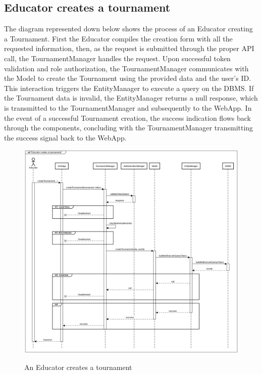 \documentclass{Configuration_Files/Template}
\begin{document}
\subsection{Educator creates a tournament }

The diagram represented down below shows the process of an Educator creating a Tournament. First the Educator compiles the creation form with all the requested information, then, as the request is submitted through the proper API call, the TournamentManager handles the request. Upon successful token validation and role authorization, the TournamentManager communicates with the Model to create the Tournament using the provided data and the user's ID. This interaction triggers the EntityManager to execute a query on the DBMS. If the Tournament data is invalid, the EntityManager returns a null response, which is transmitted to the TournamentManager and subsequently to the WebApp. In the event of a successful Tournament creation, the success indication flows back through the components, concluding with the TournamentManager transmitting the success signal back to the WebApp.

\begin{figure}[H]
\centering
\includegraphics[scale = 0.33]{Images/diagrams/sequences/createTournament.png}\\
\caption{An Educator creates a tournament }
\end{figure}
\end{document}
